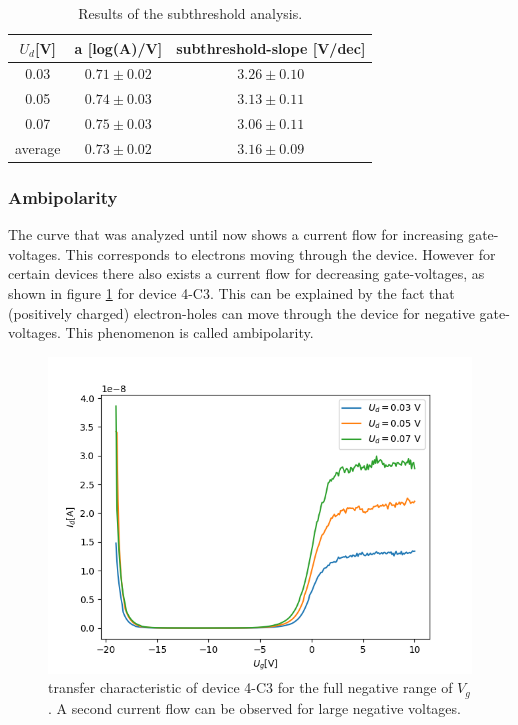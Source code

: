 \documentclass[%
 reprint,
amsmath,amssymb,
pra,
]{revtex4-1}
\begin{document}
\begin{table}
\centering
\begin{tabular}{|c|c|c|}
\hline
$U_d$[\si{V}] & a [log(A)/V] & subthreshold-slope [V/dec] \\
\hline
0.03 & $0.71\pm 0.02$ & $3.26\pm 0.10$\\
\hline
0.05 & $0.74\pm 0.03$ & $3.13\pm 0.11$\\
\hline
0.07 & $0.75\pm 0.03$ & $3.06\pm 0.11$\\
\hline
average & $0.73\pm 0.02$ & $3.16\pm 0.09$\\
\hline
\end{tabular}
\label{tab:subthreshold_example}
\caption{Results of the subthreshold analysis.}
\end{table}

\subsubsection{Ambipolarity}
The curve that was analyzed until now shows a current flow for increasing gate-voltages. This corresponds to electrons moving through the device. However for certain devices there also exists a current flow for decreasing gate-voltages, as shown in figure \ref{fig:ambipol} for device 4-C3. This can be explained by the fact that (positively charged) electron-holes can move through the device for negative gate-voltages. This phenomenon is called ambipolarity.

\begin{figure}
\centering
\includegraphics[scale=0.6]{Bilder/amipol.png}
\caption{transfer characteristic of device 4-C3 for the full negative range of $V_g$. A second current flow can be observed for large negative voltages.}
\label{fig:ambipol}
\end{figure}
\end{document}
